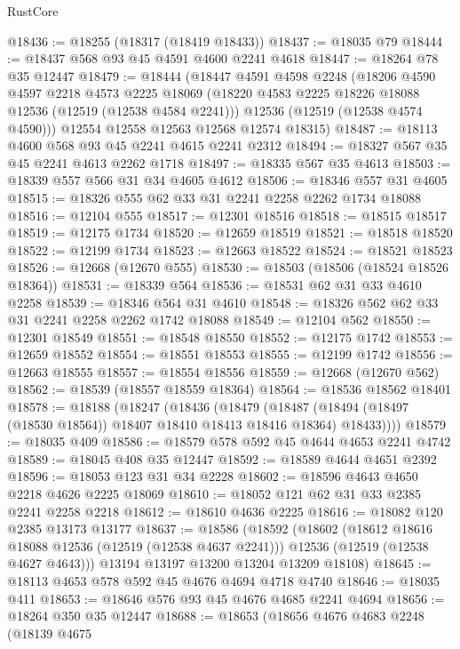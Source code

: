 \begin{lexlean}{RustCore}
\begin{coremodule}
@18436 := @18255 (@18317 (@18419 @18433))
@18437 := @18035 @79
@18444 := @18437 @568 @93 @45 @4591 @4600 @2241 @4618
@18447 := @18264 @78 @35 @12447
@18479 := @18444
    (@18447
      @4591
      @4598
      @2248
      (@18206
        @4590
        @4597
        @2218
        @4573
        @2225
        @18069
        (@18220 @4583 @2225 @18226 @18088 @12536 (@12519 (@12538 @4584 @2241)))
        @12536
        (@12519 (@12538 @4574 @4590)))
      @12554
      @12558
      @12563
      @12568
      @12574
      @18315)
@18487 := @18113 @4600 @568 @93 @45 @2241 @4615 @2241 @2312
@18494 := @18327 @567 @35 @45 @2241 @4613 @2262 @1718
@18497 := @18335 @567 @35 @4613
@18503 := @18339 @557 @566 @31 @34 @4605 @4612
@18506 := @18346 @557 @31 @4605
@18515 := @18326 @555 @62 @33 @31 @2241 @2258 @2262 @1734 @18088
@18516 := @12104 @555
@18517 := @12301 @18516
@18518 := @18515 @18517
@18519 := @12175 @1734
@18520 := @12659 @18519
@18521 := @18518 @18520
@18522 := @12199 @1734
@18523 := @12663 @18522
@18524 := @18521 @18523
@18526 := @12668 (@12670 @555)
@18530 := @18503 (@18506 (@18524 @18526 @18364))
@18531 := @18339 @564
@18536 := @18531 @62 @31 @33 @4610 @2258
@18539 := @18346 @564 @31 @4610
@18548 := @18326 @562 @62 @33 @31 @2241 @2258 @2262 @1742 @18088
@18549 := @12104 @562
@18550 := @12301 @18549
@18551 := @18548 @18550
@18552 := @12175 @1742
@18553 := @12659 @18552
@18554 := @18551 @18553
@18555 := @12199 @1742
@18556 := @12663 @18555
@18557 := @18554 @18556
@18559 := @12668 (@12670 @562)
@18562 := @18539 (@18557 @18559 @18364)
@18564 := @18536 @18562 @18401
@18578 := @18188
    (@18247
      (@18436
        (@18479
          (@18487 (@18494 (@18497 (@18530 @18564)) @18407 @18410 @18413 @18416 @18364) @18433))))
@18579 := @18035 @409
@18586 := @18579 @578 @592 @45 @4644 @4653 @2241 @4742
@18589 := @18045 @408 @35 @12447
@18592 := @18589 @4644 @4651 @2392
@18596 := @18053 @123 @31 @34 @2228
@18602 := @18596 @4643 @4650 @2218 @4626 @2225 @18069
@18610 := @18052 @121 @62 @31 @33 @2385 @2241 @2258 @2218
@18612 := @18610 @4636 @2225
@18616 := @18082 @120 @2385 @13173 @13177
@18637 := @18586
    (@18592
      (@18602
        (@18612 @18616 @18088 @12536 (@12519 (@12538 @4637 @2241)))
        @12536
        (@12519 (@12538 @4627 @4643)))
      @13194
      @13197
      @13200
      @13204
      @13209
      @18108)
@18645 := @18113 @4653 @578 @592 @45 @4676 @4694 @4718 @4740
@18646 := @18035 @411
@18653 := @18646 @576 @93 @45 @4676 @4685 @2241 @4694
@18656 := @18264 @350 @35 @12447
@18688 := @18653
    (@18656
      @4676
      @4683
      @2248
      (@18139
        @4675

\end{coremodule}
\end{lexlean}

